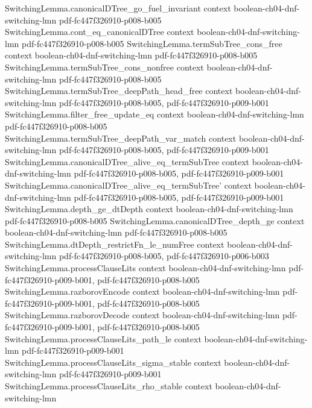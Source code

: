 \begin{theorem}
\proofstep
  {SwitchingLemma.canonicalDTree_go_fuel_invariant}
  {context}
  {boolean-ch04-dnf-switching-lmn}
  {pdf-fc447f326910-p008-b005}
\proofstep
  {SwitchingLemma.cont_eq_canonicalDTree}
  {context}
  {boolean-ch04-dnf-switching-lmn}
  {pdf-fc447f326910-p008-b005}
\proofstep
  {SwitchingLemma.termSubTree_cons_free}
  {context}
  {boolean-ch04-dnf-switching-lmn}
  {pdf-fc447f326910-p008-b005}
\proofstep
  {SwitchingLemma.termSubTree_cons_nonfree}
  {context}
  {boolean-ch04-dnf-switching-lmn}
  {pdf-fc447f326910-p008-b005}
\proofstep
  {SwitchingLemma.termSubTree_deepPath_head_free}
  {context}
  {boolean-ch04-dnf-switching-lmn}
  {pdf-fc447f326910-p008-b005,
    pdf-fc447f326910-p009-b001}
\proofstep
  {SwitchingLemma.filter_free_update_eq}
  {context}
  {boolean-ch04-dnf-switching-lmn}
  {pdf-fc447f326910-p008-b005}
\proofstep
  {SwitchingLemma.termSubTree_deepPath_var_match}
  {context}
  {boolean-ch04-dnf-switching-lmn}
  {pdf-fc447f326910-p008-b005,
    pdf-fc447f326910-p009-b001}
\proofstep
  {SwitchingLemma.canonicalDTree_alive_eq_termSubTree}
  {context}
  {boolean-ch04-dnf-switching-lmn}
  {pdf-fc447f326910-p008-b005,
    pdf-fc447f326910-p009-b001}
\proofstep
  {SwitchingLemma.canonicalDTree_alive_eq_termSubTree'}
  {context}
  {boolean-ch04-dnf-switching-lmn}
  {pdf-fc447f326910-p008-b005,
    pdf-fc447f326910-p009-b001}
\proofstep
  {SwitchingLemma.depth_ge_dtDepth}
  {context}
  {boolean-ch04-dnf-switching-lmn}
  {pdf-fc447f326910-p008-b005}
\proofstep
  {SwitchingLemma.canonicalDTree_depth_ge}
  {context}
  {boolean-ch04-dnf-switching-lmn}
  {pdf-fc447f326910-p008-b005}
\proofstep
  {SwitchingLemma.dtDepth_restrictFn_le_numFree}
  {context}
  {boolean-ch04-dnf-switching-lmn}
  {pdf-fc447f326910-p008-b005,
    pdf-fc447f326910-p006-b003}
\proofstep
  {SwitchingLemma.processClauseLits}
  {context}
  {boolean-ch04-dnf-switching-lmn}
  {pdf-fc447f326910-p009-b001,
    pdf-fc447f326910-p008-b005}
\proofstep
  {SwitchingLemma.razborovEncode}
  {context}
  {boolean-ch04-dnf-switching-lmn}
  {pdf-fc447f326910-p009-b001,
    pdf-fc447f326910-p008-b005}
\proofstep
  {SwitchingLemma.razborovDecode}
  {context}
  {boolean-ch04-dnf-switching-lmn}
  {pdf-fc447f326910-p009-b001,
    pdf-fc447f326910-p008-b005}
\proofstep
  {SwitchingLemma.processClauseLits_path_le}
  {context}
  {boolean-ch04-dnf-switching-lmn}
  {pdf-fc447f326910-p009-b001}
\proofstep
  {SwitchingLemma.processClauseLits_sigma_stable}
  {context}
  {boolean-ch04-dnf-switching-lmn}
  {pdf-fc447f326910-p009-b001}
\proofstep
  {SwitchingLemma.processClauseLits_rho_stable}
  {context}
  {boolean-ch04-dnf-switching-lmn}

\end{theorem}
